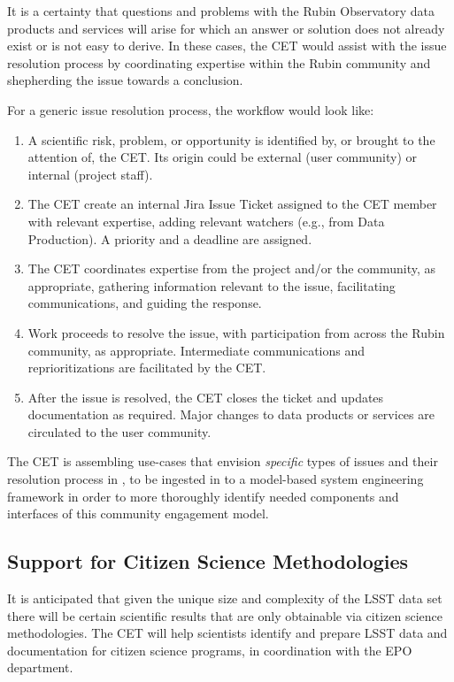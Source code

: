 \documentclass[DM,lsstdraft,toc]{lsstdoc}
\begin{document}
It is a certainty that questions and problems with the Rubin Observatory data products and services will arise for which an answer or solution does not already exist or is not easy to derive. 
In these cases, the CET would assist with the issue resolution process by coordinating expertise within the Rubin community and shepherding the issue towards a conclusion.

For a generic issue resolution process, the workflow would look like:
\begin{enumerate}
\item A scientific risk, problem, or opportunity is identified by, or brought to the attention of, the CET. Its origin could be external (user community) or internal (project staff).
\item The CET create an internal Jira Issue Ticket assigned to the CET member with relevant expertise, adding relevant watchers (e.g., from Data Production). A priority and a deadline are assigned. 
\item The CET coordinates expertise from the project and/or the community, as appropriate, gathering information relevant to the issue, facilitating communications, and guiding the response.
\item Work proceeds to resolve the issue, with participation from across the Rubin community, as appropriate. Intermediate communications and reprioritizations are facilitated by the CET.
\item After the issue is resolved, the CET closes the ticket and updates documentation as required. Major changes to data products or services are circulated to the user community.
\end{enumerate}

The CET is assembling use-cases that envision \textit{specific} types of issues and their resolution process in , to be ingested in to a model-based system engineering framework in order to more thoroughly identify needed components and interfaces of this community engagement model. 


\subsection{Support for Citizen Science Methodologies}\label{ssec:mod_citizen}

It is anticipated that given the unique size and complexity of the LSST data set there will be certain scientific results that are only obtainable via citizen science methodologies.
The CET will help scientists identify and prepare LSST data and documentation for citizen science programs, in coordination with the EPO department. 
\end{document}
